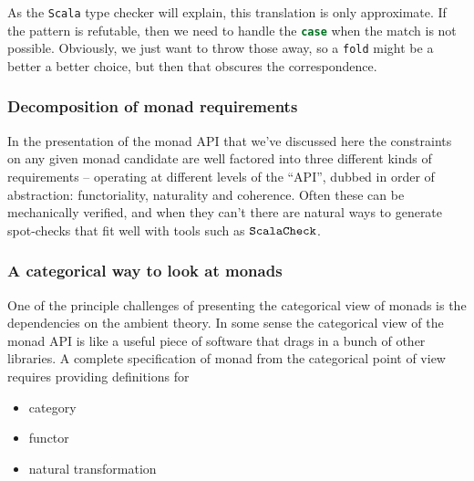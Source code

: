 As the \texttt{Scala} type checker will explain, this translation is
only approximate. If the pattern is refutable, then we need to handle
the \lstinline[language=Scala]!case! when the match is not
possible. Obviously, we just want to throw those away, so a
\lstinline[language=Scala]!fold! might be a better a better choice,
but then that obscures the correspondence.


\subsubsection{Decomposition of monad requirements}

In the presentation of the monad API that we've discussed here the
constraints on any given monad candidate are well factored into three
different kinds of requirements -- operating at different levels of
the ``API'', dubbed in order of abstraction: functoriality, naturality
and coherence. Often these can be mechanically verified, and when they
can't there are natural ways to generate spot-checks that fit well
with tools such as $\texttt{ScalaCheck}$.

\subsubsection{A categorical way to look at monads}

One of the principle challenges of presenting the categorical view of
monads is the dependencies on the ambient theory. In some sense the
categorical view of the monad API is like a useful piece of software
that drags in a bunch of other libraries. A complete specification of
monad from the categorical point of view requires providing
definitions for

\begin{itemize}
  \item category
  \item functor
  \item natural transformation
\end{itemize}


